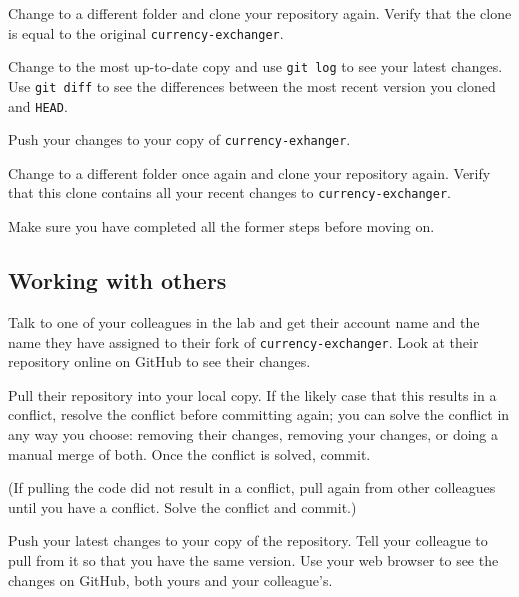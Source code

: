 \documentclass{article}
\begin{document}
Change to a different folder and clone your repository again. Verify
that the clone is equal to the original \verb+currency-exchanger+. 

Change to the most up-to-date copy and use \verb+git log+ to see your
latest changes. Use \verb+git diff+ to see the differences between the
most recent version you cloned and \verb+HEAD+. 

Push your changes to your copy of \verb+currency-exhanger+.

Change to a different folder once again and clone your repository
again. Verify that this clone contains all your recent changes to
\verb+currency-exchanger+.

Make sure you have completed all the former steps before moving on. 

\subsection{Working with others}
\label{sec:working-with-others}

Talk to one of your colleagues in the lab and get their account name
and the name they have assigned to their fork of
\verb+currency-exchanger+. Look at their repository online on GitHub
to see their changes. 

Pull their repository into your local copy. If the likely case that
this results in a conflict, resolve the conflict before committing
again; you can solve the conflict in any way you choose: removing
their changes, removing your changes, or doing a manual merge of
both. Once the conflict is solved, commit. 

(If pulling the code did not result in a conflict, pull again from
other colleagues until you have a conflict. Solve the conflict and
commit.) 

Push your latest changes to your copy of the repository. Tell your
colleague to pull from it so that you have the same version. Use your
web browser to see the changes on GitHub, both yours and your
colleague's. 
\end{document}
